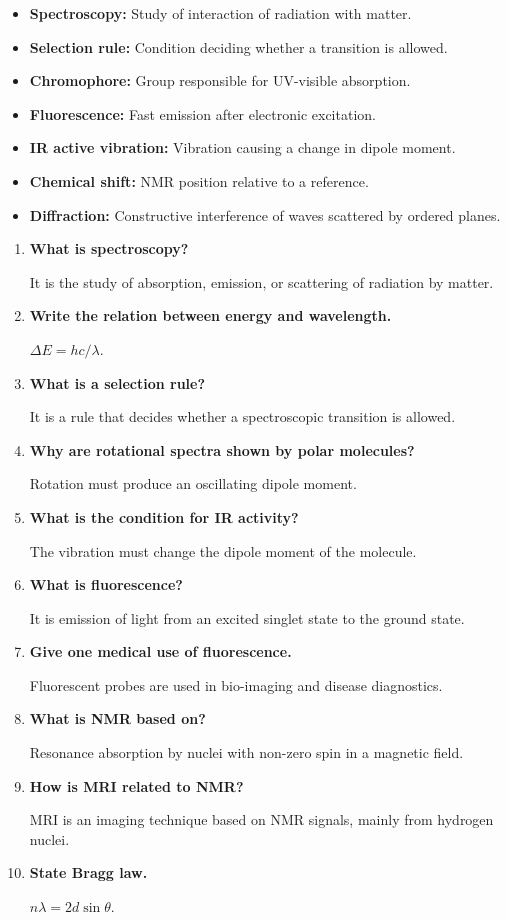 \documentclass[12pt,a4paper]{article}
\newcommand{\Q}[1]{\textbf{#1}\par\noindent\ignorespaces}
\begin{document}
\begin{tcolorbox}[defbox, title={One-Line Definitions}]
\begin{itemize}[leftmargin=*, itemsep=2pt, topsep=2pt]
  \item \textbf{Spectroscopy:} Study of interaction of radiation with matter.
  \item \textbf{Selection rule:} Condition deciding whether a transition is allowed.
  \item \textbf{Chromophore:} Group responsible for UV-visible absorption.
  \item \textbf{Fluorescence:} Fast emission after electronic excitation.
  \item \textbf{IR active vibration:} Vibration causing a change in dipole moment.
  \item \textbf{Chemical shift:} NMR position relative to a reference.
  \item \textbf{Diffraction:} Constructive interference of waves scattered by ordered planes.
\end{itemize}
\end{tcolorbox}

\begin{tcolorbox}[exambox, title={Frequently Asked / Viva Questions}]
\begin{enumerate}[topsep=0pt, label=\textbf{Q\arabic*.}, itemsep=5pt]
  \item \Q{What is spectroscopy?}
    It is the study of absorption, emission, or scattering of radiation by matter.
  \item \Q{Write the relation between energy and wavelength.}
    $\Delta E=hc/\lambda$.
  \item \Q{What is a selection rule?}
    It is a rule that decides whether a spectroscopic transition is allowed.
  \item \Q{Why are rotational spectra shown by polar molecules?}
    Rotation must produce an oscillating dipole moment.
  \item \Q{What is the condition for IR activity?}
    The vibration must change the dipole moment of the molecule.
  \item \Q{What is fluorescence?}
    It is emission of light from an excited singlet state to the ground state.
  \item \Q{Give one medical use of fluorescence.}
    Fluorescent probes are used in bio-imaging and disease diagnostics.
  \item \Q{What is NMR based on?}
    Resonance absorption by nuclei with non-zero spin in a magnetic field.
  \item \Q{How is MRI related to NMR?}
    MRI is an imaging technique based on NMR signals, mainly from hydrogen nuclei.
  \item \Q{State Bragg law.}
    $n\lambda=2d\sin\theta$.
\end{enumerate}
\end{tcolorbox}
\end{document}
